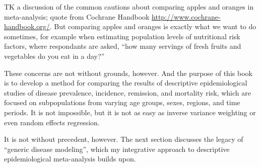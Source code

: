 TK a discussion of the common cautions about comparing apples and
oranges in meta-analysis; quote from Cochrane Handbook
\url{http://www.cochrane-handbook.org/}.  But comparing apples and
oranges is exactly what we want to do sometimes, for example when
estimating population levels of nutritional risk factors, where
respondants are asked, ``how many servings of fresh fruits and
vegetables do you eat in a day?''

These concerns are not without grounds, however.  And the purpose of
this book is to develop a method for comparing the results of
descriptive epidemiological studies of disease prevalence, incidence,
remission, and mortality risk, which are focused on subpopulations
from varying age groups, sexes, regions, and time periods.  It is not
impossible, but it is not as easy as inverse variance weighting or
even random effects regression.

It is not without precedent, however.  The next section discusses the
legacy of ``generic disease modeling'', which my integrative approach
to descriptive epidemiological meta-analysis builds upon.



